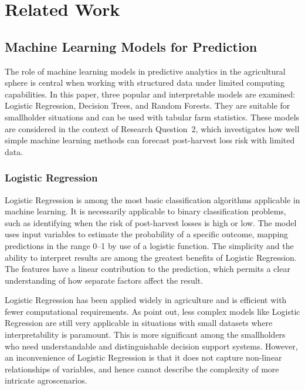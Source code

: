 \chapter{Related Work}
\label{chap:related}

\section{Machine Learning Models for Prediction}

The role of machine learning models in predictive analytics in the agricultural sphere is central
when working with structured data under limited computing capabilities. In this paper, three popular
and interpretable models are examined: Logistic Regression, Decision Trees, and Random Forests. They
are suitable for smallholder situations and can be used with tabular farm statistics. These models
are considered in the context of Research Question~2, which investigates how well simple machine
learning methods can forecast post-harvest loss risk with limited data.

\subsection{Logistic Regression}

Logistic Regression is among the most basic classification algorithms applicable in machine
learning. It is necessarily applicable to binary classification problems, such as identifying when
the risk of post-harvest losses is high or low. The model uses input variables to estimate the
probability of a specific outcome, mapping predictions in the range 0--1 by use of a logistic
function. The simplicity and the ability to interpret results are among the greatest benefits of
Logistic Regression. The features have a linear contribution to the prediction, which permits a
clear understanding of how separate factors affect the result.

Logistic Regression has been applied widely in agriculture and is efficient with fewer computational
requirements. As \cite{jabed2024crop} point out, less complex models like Logistic Regression are
still very applicable in situations with small datasets where interpretability is paramount. This is
more significant among the smallholders who need understandable and distinguishable decision support
systems. However, an inconvenience of Logistic Regression is that it does not capture non-linear
relationships of variables, and hence cannot describe the complexity of more intricate
agroscenarios.

